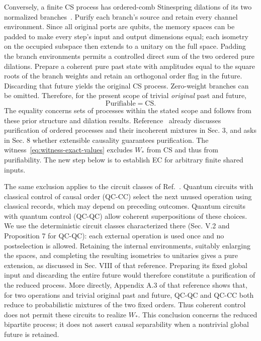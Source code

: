 \documentclass[11pt]{article}
\newcommand{\CS}{\mathrm{CS}}
\begin{document}
Conversely, a finite CS process has ordered-comb Stinespring dilations of its two normalized branches~\cite{Stinespring,QuantumNetworks,purif}. Purify each branch's source and retain every channel environment. Since all original ports are qubits, the memory spaces can be padded to make every step's input and output dimensions equal; each isometry on the occupied subspace then extends to a unitary on the full space. Padding the branch environments permits a controlled direct sum of the two ordered pure dilations. Prepare a coherent pure past state with amplitudes equal to the square roots of the branch weights and retain an orthogonal order flag in the future. Discarding that future yields the original CS process. Zero-weight branches can be omitted. Therefore, for the present scope of trivial \emph{original} past and future,
\begin{equation}
 \mathrm{Purifiable}=\CS.
 \label{eq:purifiable-CS}
\end{equation}
The equality concerns sets of processes within the stated scope and follows from these prior structure and dilation results. Reference~\cite{purif} already discusses purification of ordered processes and their incoherent mixtures in Sec. 3, and asks in Sec. 8 whether extensible causality guarantees purification. The witness~\eqref{eq:witness-exact-values} excludes $W_*$ from CS and thus from purifiability. The new step below is to establish EC for arbitrary finite shared inputs.

The same exclusion applies to the circuit classes of Ref.~\cite{QCQC}. Quantum circuits with classical control of causal order (QC-CC) select the next unused operation using classical records, which may depend on preceding outcomes. Quantum circuits with quantum control (QC-QC) allow coherent superpositions of these choices. We use the deterministic circuit classes characterized there (Sec. V.2 and Proposition 7 for QC-QC): each external operation is used once and no postselection is allowed. Retaining the internal environments, suitably enlarging the spaces, and completing the resulting isometries to unitaries gives a pure extension, as discussed in Sec. VIII of that reference. Preparing its fixed global input and discarding the entire future would therefore constitute a purification of the reduced process. More directly, Appendix A.3 of that reference shows that, for two operations and trivial original past and future, QC-QC and QC-CC both reduce to probabilistic mixtures of the two fixed orders. Thus coherent control does not permit these circuits to realize $W_*$. This conclusion concerns the reduced bipartite process; it does not assert causal separability when a nontrivial global future is retained.
\end{document}
